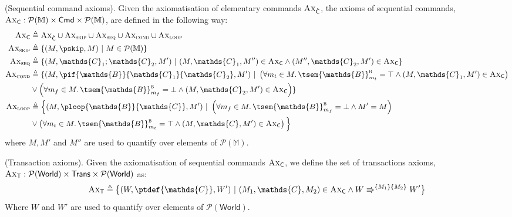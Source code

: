 \begin{defn}
	(Sequential command axioms).
	Given the axiomatisation of elementary commands $\textsc{Ax}_{\hat{\mathsf{C}}}$, the axioms of sequential commands, $\textsc{Ax}_\mathsf{C} : \mathcal{P}(\mathbb{M}) \times \mathsf{Cmd} \times \mathcal{P}(\mathbb{M})$, are defined in the following way:
	\begin{align*}
		\textsc{Ax}_\mathsf{C} &\triangleq \textsc{Ax}_{\hat{\mathsf{C}}} \cup \textsc{Ax}_{\textsc{skip}} \cup \textsc{Ax}_{\textsc{seq}} \cup \textsc{Ax}_{\textsc{cond}} \cup \textsc{Ax}_{\textsc{loop}}
		\\
		\textsc{Ax}_{\textsc{skip}} &\triangleq \{ (M, \pskip, M)\ |\ M \in \mathcal{P}(\mathbb{M}) \}
		\\
		\textsc{Ax}_{\textsc{seq}} &\triangleq \{ (M, \mathds{C}_1 ; \mathds{C}_2, M')\ |\ (M, \mathds{C}_1, M'') \in \textsc{Ax}_\mathsf{C} \land (M'', \mathds{C}_2, M') \in \textsc{Ax}_\mathsf{C} \}
		\\
		\textsc{Ax}_{\textsc{cond}} &\triangleq \{ (M, \pif{\mathds{B}}{\mathds{C}_1}{\mathds{C}_2}, M')\ |\ \left( \forall m_t \in M \ldotp \tsem{\mathds{B}}^\textsc{b}_{m_t} = \top \land (M, \mathds{C}_1, M') \in \textsc{Ax}_\mathsf{C} \right) \\ &\lor \left( \forall m_f \in M \ldotp \tsem{\mathds{B}}^\textsc{b}_{m_f} = \bot \land (M, \mathds{C}_2, M') \in \textsc{Ax}_\mathsf{C} \right) \}
		\\
		\textsc{Ax}_{\textsc{loop}} &\triangleq \Big\{ (M, \ploop{\mathds{B}}{\mathds{C}}, M')\ |\ \left( \forall m_f \in M \ldotp \tsem{\mathds{B}}^\textsc{b}_{m_f} = \bot \land M' = M \right) \\ &\lor \left( \forall m_t \in M \ldotp \tsem{\mathds{B}}^\textsc{b}_{m_t} = \top \land  (M, \mathds{C}, M') \in \textsc{Ax}_\mathsf{C} \right) \Big\}
	\end{align*}
	where $M, M'$ and $M''$ are used to quantify over elements of $\mathcal{P}(\mathbb{M})$.
\end{defn}

\begin{defn}
	(Transaction axioms).
	Given the axiomatisation of sequential commands $\textsc{Ax}_\mathsf{C}$, we define the set of transactions axioms, $\textsc{Ax}_\mathsf{T} : \mathcal{P}(\mathsf{World}) \times \mathsf{Trans} \times \mathcal{P}(\mathsf{World})$ as:
	\[
		\textsc{Ax}_\mathsf{T}
			\triangleq
		\big\{ (W, \ptdef{\mathds{C}}, W')\ |\ (M_1, \mathds{C}, M_2) \in \textsc{Ax}_\mathsf{C} \land W \Rrightarrow^{\{M_1\}\{M_2\}} W' \big\}
	\]
	Where $W$ and $W'$ are used to quantify over elements of $\mathcal{P}(\mathsf{World})$.
\end{defn}

